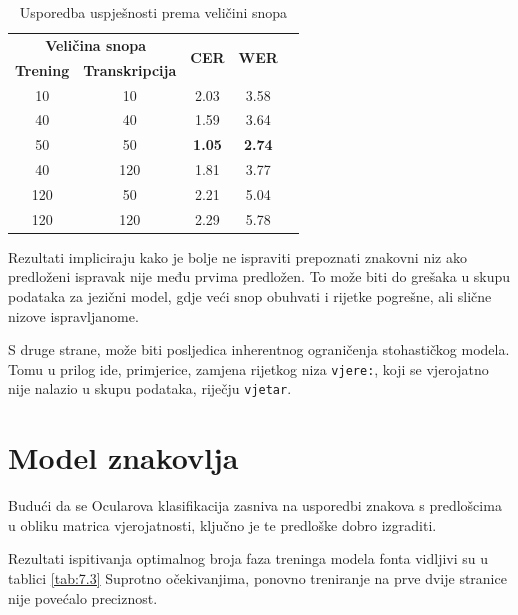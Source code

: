 \documentclass[zavrsnirad]{fer}
\begin{document}
\bgroup
\def\arraystretch{1.25}
\begin{table}[h]
	\centering
	\begin{tabular}{|c|c|c|c|c|}
		\hline 
		\multicolumn{2}{|c|}{\textbf{Veličina snopa}} & \multicolumn{1}{|c|}{\multirow{2}{*}{\textbf{CER}}} & \multicolumn{1}{|c|}{\multirow{2}{*}{\textbf{WER}}} \\ \cline{1-2}
		
		\textbf{Trening}  & \textbf{Transkripcija}  & \multicolumn{1}{|c|}{}  & \multicolumn{1}{|c|}{}  \\ \hline
		10  & 10 &  2.03 & 3.58  \\ \hline
		40 & 40 &  1.59 & 3.64   \\ \hline
		50 & 50 &  \textbf{1.05} & \textbf{2.74}   \\ \hline
		40 & 120 & 1.81 & 3.77   \\ \hline
		120 & 50 & 2.21 & 5.04 \\ \hline        
		120 & 120 & 2.29 & 5.78 \\ \hline                                             
	\end{tabular}
	\caption{Usporedba uspješnosti prema veličini snopa}
	\label{tab:7.2}
\end{table}
\egroup

Rezultati impliciraju kako je bolje ne ispraviti prepoznati znakovni niz ako predloženi ispravak nije među prvima predložen. To može biti do grešaka u skupu podataka za jezični model, gdje veći snop obuhvati i rijetke pogrešne, ali slične nizove ispravljanome. 

S druge strane, može biti posljedica inherentnog ograničenja stohastičkog modela. Tomu u prilog ide, primjerice, zamjena rijetkog niza \texttt{vjere:}, koji se vjerojatno nije nalazio u skupu podataka, riječju \texttt{vjetar}. 

\section{Model znakovlja}

Budući da se Ocularova klasifikacija zasniva na usporedbi znakova s predlošcima u obliku matrica vjerojatnosti, ključno je te predloške dobro izgraditi.

Rezultati ispitivanja optimalnog broja faza treninga modela fonta vidljivi su u tablici \ref{tab:7.3}  Suprotno očekivanjima, ponovno treniranje na prve dvije stranice nije povećalo preciznost.
\end{document}

